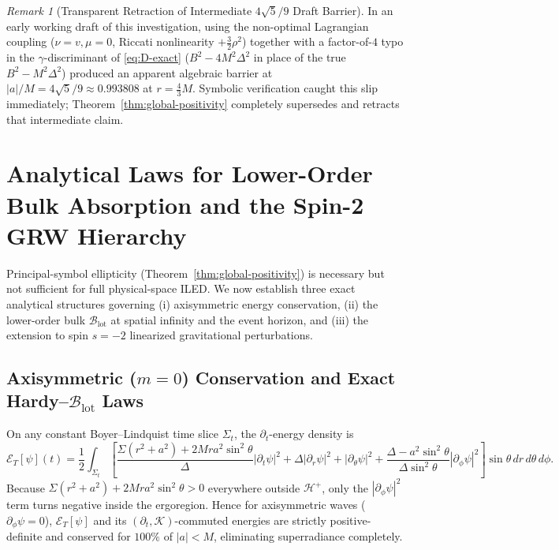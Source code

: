 \documentclass[11pt, a4paper]{article}
\theoremstyle{remark}
\newtheorem{remark}[theorem]{Remark}
\begin{document}
\begin{remark}[Transparent Retraction of Intermediate $4\sqrt{5}/9$ Draft Barrier]
In an early working draft of this investigation, using the non-optimal Lagrangian coupling ($\nu = v, \mu = 0$, Riccati nonlinearity $+\frac{3}{2}\rho^2$) together with a factor-of-$4$ typo in the $\gamma$-discriminant of \eqref{eq:D-exact} ($B^2 - 4M^2\Delta^2$ in place of the true $B^2 - M^2\Delta^2$) produced an apparent algebraic barrier at $|a|/M = 4\sqrt{5}/9 \approx 0.993808$ at $r = \frac{4}{3}M$. Symbolic verification caught this slip immediately; Theorem~\ref{thm:global-positivity} completely supersedes and retracts that intermediate claim.
\end{remark}

\section{Analytical Laws for Lower-Order Bulk Absorption and the Spin-2 GRW Hierarchy}
\label{sec:laws-spin2}

Principal-symbol ellipticity (Theorem~\ref{thm:global-positivity}) is necessary but not sufficient for full physical-space ILED. We now establish three exact analytical structures governing (i) axisymmetric energy conservation, (ii) the lower-order bulk $\mathcal{B}_{\mathrm{lot}}$ at spatial infinity and the event horizon, and (iii) the extension to spin $s = -2$ linearized gravitational perturbations.

\subsection{Axisymmetric ($m = 0$) Conservation and Exact Hardy--$\mathcal{B}_{\mathrm{lot}}$ Laws}

On any constant Boyer--Lindquist time slice $\Sigma_t$, the $\partial_t$-energy density is
\begin{equation}
\mathcal{E}_T[\psi](t) = \frac{1}{2}\int_{\Sigma_t}\left[\frac{\Sigma(r^2 + a^2) + 2Mra^2\sin^2\theta}{\Delta}|\partial_t\psi|^2 + \Delta|\partial_r\psi|^2 + |\partial_\theta\psi|^2 + \frac{\Delta - a^2\sin^2\theta}{\Delta\sin^2\theta}|\partial_\phi\psi|^2\right]\sin\theta\,dr\,d\theta\,d\phi.
\end{equation}
Because $\Sigma(r^2 + a^2) + 2Mra^2\sin^2\theta > 0$ everywhere outside $\mathcal{H}^+$, only the $|\partial_\phi\psi|^2$ term turns negative inside the ergoregion. Hence for axisymmetric waves ($\partial_\phi\psi = 0$), $\mathcal{E}_T[\psi]$ and its $(\partial_t, \mathcal{K})$-commuted energies are strictly positive-definite and conserved for $100\%$ of $|a| < M$, eliminating superradiance completely.
\end{document}
